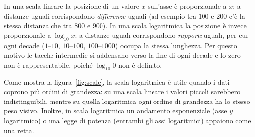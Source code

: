 \documentclass[11pt,a4paper,oneside]{book}
\begin{document}
In una scala lineare la posizione di un valore $x$ sull'asse è proporzionale
a $x$: a distanze uguali corrispondono \emph{differenze} uguali (ad esempio
tra $100$ e $200$ c'è la stessa distanza che tra $800$ e $900$). In una scala
logaritmica la posizione è invece proporzionale a $\log_{10} x$: a distanze
uguali corrispondono \emph{rapporti} uguali, per cui ogni decade
($1$--$10$, $10$--$100$, $100$--$1000$) occupa la stessa lunghezza. Per
questo motivo le tacche intermedie si addensano verso la fine di ogni decade
e lo zero non è rappresentabile, poiché $\log_{10} 0$ non è definito.

Come mostra la figura~\ref{fig:scale}, la scala logaritmica è utile quando i
dati coprono più ordini di grandezza: su una scala lineare i valori piccoli
sarebbero indistinguibili, mentre su quella logaritmica ogni ordine di
grandezza ha lo stesso peso visivo. Inoltre, in scala logaritmica un
andamento esponenziale (asse $y$ logaritmico) o una legge di potenza
(entrambi gli assi logaritmici) appaiono come una retta.
\end{document}
